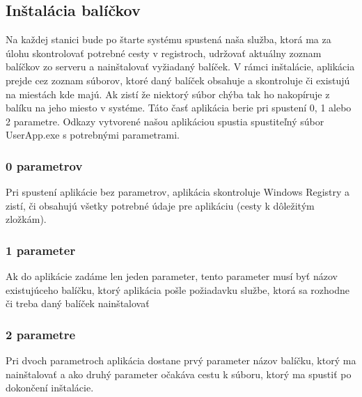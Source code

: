 \subsection{Inštalácia balíčkov}
Na každej stanici bude po štarte systému spustená naša služba, ktorá ma za úlohu skontrolovať potrebné cesty v registroch, udržovať aktuálny zoznam balíčkov zo serveru a nainštalovať vyžiadaný balíček. V rámci inštalácie, aplikácia prejde cez zoznam súborov, ktoré daný balíček obsahuje a skontroluje či existujú na miestách kde majú. Ak zistí že niektorý súbor chýba tak ho nakopíruje z balíku na jeho miesto v systéme. Táto časť aplikácia berie pri spustení 0, 1 alebo 2 parametre. Odkazy vytvorené našou aplikáciou spustia spustiteľný súbor UserApp.exe s potrebnými parametrami.

\subsubsection{0 parametrov}
Pri spustení aplikácie bez parametrov, aplikácia skontroluje Windows Registry a zistí, či obsahujú všetky potrebné údaje pre aplikáciu (cesty k dôležitým zložkám).

\subsubsection{1 parameter}
Ak do aplikácie zadáme len jeden parameter, tento parameter musí byť názov existujúceho balíčku, ktorý aplikácia pošle požiadavku službe, ktorá sa rozhodne či treba daný balíček nainštalovať

\subsubsection{2 parametre}
Pri dvoch parametroch aplikácia dostane prvý parameter názov balíčku, ktorý ma nainštalovať a ako druhý parameter očakáva cestu k súboru, ktorý ma spustiť po dokončení inštalácie.


